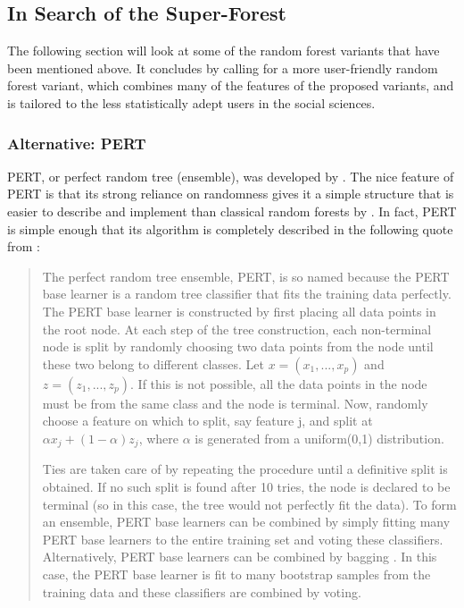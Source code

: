 \documentclass[a4paper,man,12pt,apacite,floatsintext,draftfirst]{apa6} %
\begin{document}
\subsection{In Search of the Super-Forest}
The following section will look at some of the random forest variants that
have been mentioned above. It concludes by calling for a more
user-friendly random forest variant, which combines many of the features of
the proposed variants, and is tailored to the less statistically adept users
in the social sciences.

\subsubsection{Alternative: PERT}
PERT, or perfect random tree (ensemble), was developed by .
The nice feature of PERT is that its strong reliance on randomness gives
it a simple structure that is easier to describe and implement than
classical random forests by .
In fact, PERT is simple enough that its algorithm is completely described
in the following quote from :

\begin{quotation}
The perfect random tree ensemble, PERT, is so named because the PERT base
learner is a random tree classifier that fits the training data perfectly.
The PERT base learner is constructed by first placing all data points in
the root node.
At each step of the tree construction, each non-terminal node is split by
randomly choosing two data points from the node until these two belong to
different classes.
Let \( x = (x_{1} , . . . , x_{p} ) \) and \( z = (z_{1} , . . . , z_{p} ) \).
If this is not possible, all the data points in the node must be from the
same class and the node is terminal.
Now, randomly choose a feature on which to split, say feature j, and split
at \( \alpha x_{j} + (1 - \alpha) z_{j} \), where \( \alpha \) is generated
from a uniform(0,1) distribution.

Ties are taken care of by repeating the procedure until a definitive
split is obtained.
If no such split is found after 10 tries, the node is declared to be
terminal (so in this case, the tree would not perfectly fit the data).
To form an ensemble, PERT base learners can be combined by simply fitting
many PERT base learners to the entire training set and voting these
classifiers.
Alternatively, PERT base learners can be combined by bagging
\cite{breiman1996bagging}.
In this case, the PERT base learner is fit to many bootstrap samples
from the training data and these classifiers are combined by voting.
\end{quotation}
\end{document}
